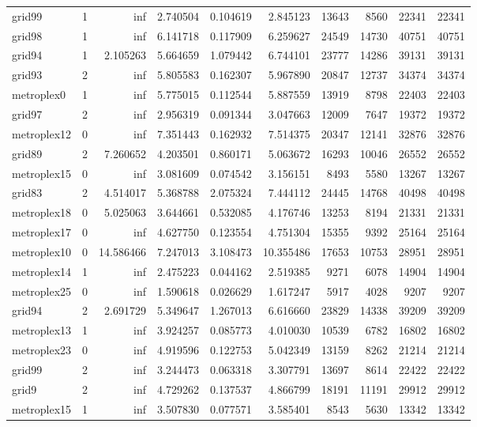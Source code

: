 \begin{longtable}{|l|r|r|r|r|r|r|r|r|r|}
grid99 & 1 & inf & 2.740504 & 0.104619 & 2.845123 & 13643 & 8560 & 22341 & 22341 \\
grid98 & 1 & inf & 6.141718 & 0.117909 & 6.259627 & 24549 & 14730 & 40751 & 40751 \\
grid94 & 1 & 2.105263 & 5.664659 & 1.079442 & 6.744101 & 23777 & 14286 & 39131 & 39131 \\
grid93 & 2 & inf & 5.805583 & 0.162307 & 5.967890 & 20847 & 12737 & 34374 & 34374 \\
metroplex0 & 1 & inf & 5.775015 & 0.112544 & 5.887559 & 13919 & 8798 & 22403 & 22403 \\
grid97 & 2 & inf & 2.956319 & 0.091344 & 3.047663 & 12009 & 7647 & 19372 & 19372 \\
metroplex12 & 0 & inf & 7.351443 & 0.162932 & 7.514375 & 20347 & 12141 & 32876 & 32876 \\
grid89 & 2 & 7.260652 & 4.203501 & 0.860171 & 5.063672 & 16293 & 10046 & 26552 & 26552 \\
metroplex15 & 0 & inf & 3.081609 & 0.074542 & 3.156151 & 8493 & 5580 & 13267 & 13267 \\
grid83 & 2 & 4.514017 & 5.368788 & 2.075324 & 7.444112 & 24445 & 14768 & 40498 & 40498 \\
metroplex18 & 0 & 5.025063 & 3.644661 & 0.532085 & 4.176746 & 13253 & 8194 & 21331 & 21331 \\
metroplex17 & 0 & inf & 4.627750 & 0.123554 & 4.751304 & 15355 & 9392 & 25164 & 25164 \\
metroplex10 & 0 & 14.586466 & 7.247013 & 3.108473 & 10.355486 & 17653 & 10753 & 28951 & 28951 \\
metroplex14 & 1 & inf & 2.475223 & 0.044162 & 2.519385 & 9271 & 6078 & 14904 & 14904 \\
metroplex25 & 0 & inf & 1.590618 & 0.026629 & 1.617247 & 5917 & 4028 & 9207 & 9207 \\
grid94 & 2 & 2.691729 & 5.349647 & 1.267013 & 6.616660 & 23829 & 14338 & 39209 & 39209 \\
metroplex13 & 1 & inf & 3.924257 & 0.085773 & 4.010030 & 10539 & 6782 & 16802 & 16802 \\
metroplex23 & 0 & inf & 4.919596 & 0.122753 & 5.042349 & 13159 & 8262 & 21214 & 21214 \\
grid99 & 2 & inf & 3.244473 & 0.063318 & 3.307791 & 13697 & 8614 & 22422 & 22422 \\
grid9 & 2 & inf & 4.729262 & 0.137537 & 4.866799 & 18191 & 11191 & 29912 & 29912 \\
metroplex15 & 1 & inf & 3.507830 & 0.077571 & 3.585401 & 8543 & 5630 & 13342 & 13342 \\

\end{longtable}
